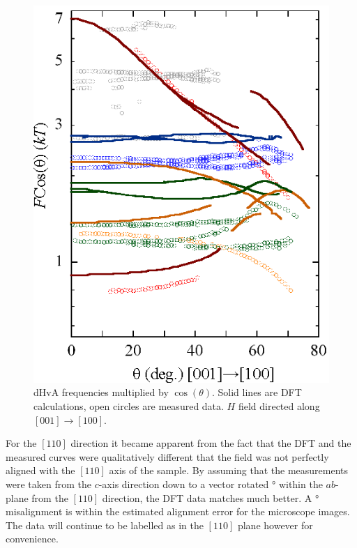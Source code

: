 \begin{figure}
    \begin{center}
        \includegraphics[scale=0.7]{Chapter-dHvABaFe2P2/Figures/AngleDepMeasurements/AngleSweepMeasuredUnshifted/AngleSweepMeasuredUnshifted}
        \caption{dHvA frequencies multiplied by $\cos(\theta)$. Solid lines are DFT calculations, open circles are measured data. $H$ field directed along $[001]\rightarrow[100]$.}
        \label{Fig:ResD:AngleSweepMeasuredUnshifted}
    \end{center}
\end{figure}

For the $[110]$ direction it became apparent from the fact that the DFT and the measured curves were qualitatively different that the field was not perfectly aligned with the $[110]$ axis of the sample. By assuming that the measurements were taken from the $c$-axis direction down to a vector rotated \unit[10]{\degree} within the $ab$-plane from the $[110]$ direction, the DFT data matches much better. A \unit[10]{\degree} misalignment is within the estimated alignment error for the microscope images. The data will continue to be labelled as in the $[110]$ plane however for convenience.

